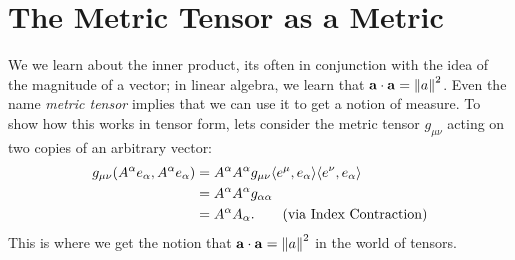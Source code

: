 \section{The Metric Tensor as a Metric}
We we learn about the inner product, its often in conjunction with the idea of the magnitude of a vector; in linear algebra, we learn that $\vb{a}\cdot\vb{a} = \norm{a}^2$.
Even the name \emph{metric tensor} implies that we can use it to get a notion of measure.
To show how this works in tensor form, lets consider the metric tensor $g_{\mu\nu}$ acting on two copies of an arbitrary vector:
\begin{align*}
    g_{\mu\nu}\qty(A^\alpha e_\alpha, A^\alpha e_\alpha) &= A^\alpha A^\alpha g_{\mu\nu} \langle e^\mu, e_\alpha \rangle \langle e^\nu, e_\alpha \rangle \\
    &= A^\alpha A^\alpha g_{\alpha\alpha} \\
    &= A^\alpha A_\alpha. \tag{via Index Contraction}
\end{align*}
This is where we get the notion that $\vb{a}\cdot\vb{a} = \norm{a}^2$ in the world of tensors.
